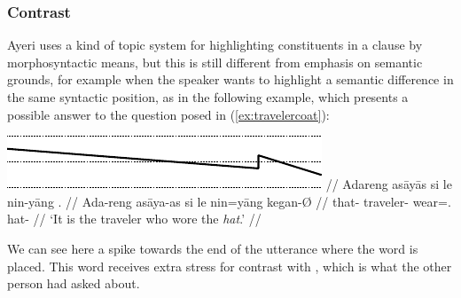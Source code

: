 \subsubsection{Contrast}

Ayeri uses a kind of topic system for highlighting constituents in 
a clause by morphosyntactic means, but this is still different from emphasis on 
semantic grounds, for example when the speaker wants to highlight a 
semantic difference in the same syntactic position, as in the following example, 
which presents a possible answer to the question posed in 
(\ref{ex:travelercoat}):

\ex\begingl
	\glpreamble \raisebox{-1.5em}
		{\includegraphics{images/contours-contrast.pdf}} //
	\gla Adareng asāyās si le nin-yāng . //
	\glb Ada-reng asāya-as si le nin=yāng kegan-Ø //
	\glc that-\AargI{} traveler-\Parg{} \Rel{} \PatTI{} wear=\TsgM{}.\Aarg{} 
		hat-\Top{} //
	\glft `It is the traveler who wore the \emph{hat}.' //
\endgl\xe

We can see here a spike towards the end of the utterance where the word 
 is placed. This word receives extra stress for 
contrast with , which is what the other person had asked 
about.
